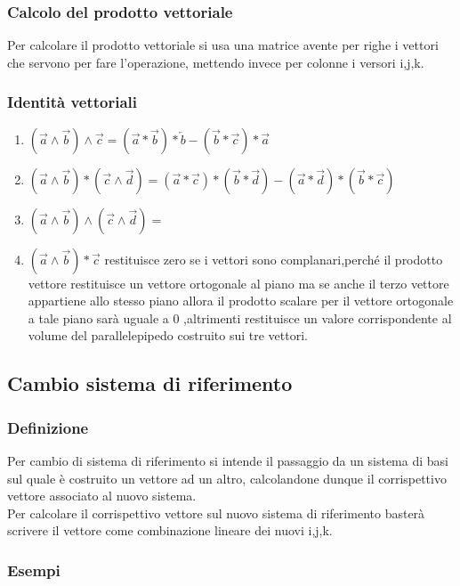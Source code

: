 \documentclass[fontsize = 20px, paper = a4]{article}
\begin{document}
\subsubsection{Calcolo del prodotto vettoriale}
Per calcolare il prodotto vettoriale si usa una matrice avente per righe i vettori che servono per fare l'operazione, mettendo invece per colonne i versori i,j,k.
\subsubsection{Identità vettoriali}
\begin{enumerate}
\item $(\overrightarrow{a} \wedge \overrightarrow{b})\wedge \overrightarrow{c} = (\overrightarrow{a}*\overrightarrow{b})*\overleftarrow{b} - (\overrightarrow{b}*\overrightarrow{c})*\overrightarrow{a} $
\item $(\overrightarrow{a} \wedge \overrightarrow{b})*(\overrightarrow{c} \wedge \overrightarrow{d}) = (\overrightarrow{a}*\overrightarrow{c})*(\overrightarrow{b}*\overrightarrow{d})-(\overrightarrow{a}*\overrightarrow{d})*(\overrightarrow{b}*\overrightarrow{c})$
\item $(\overrightarrow{a} \wedge \overrightarrow{b}) \wedge(\overrightarrow{c} \wedge \overrightarrow{d})= $
\item $(\overrightarrow{a} \wedge \overrightarrow{b})*\overrightarrow{c}$ restituisce zero se i vettori sono complanari,perché il prodotto vettore restituisce un vettore ortogonale al piano ma se anche il terzo vettore appartiene allo stesso piano allora il prodotto scalare per il vettore ortogonale a tale piano sarà uguale a 0 ,altrimenti restituisce un valore corrispondente al volume del parallelepipedo costruito sui tre vettori.
\end{enumerate}
\subsection{Cambio sistema di riferimento}
\subsubsection{Definizione}
Per cambio di sistema di riferimento si intende il passaggio da un sistema di basi sul quale è costruito un vettore ad un altro, calcolandone dunque il corrispettivo vettore associato al nuovo sistema.\\
Per calcolare il corrispettivo vettore sul nuovo sistema di riferimento basterà scrivere il vettore come combinazione lineare dei nuovi i,j,k.
\subsubsection{Esempi}
\end{document}
